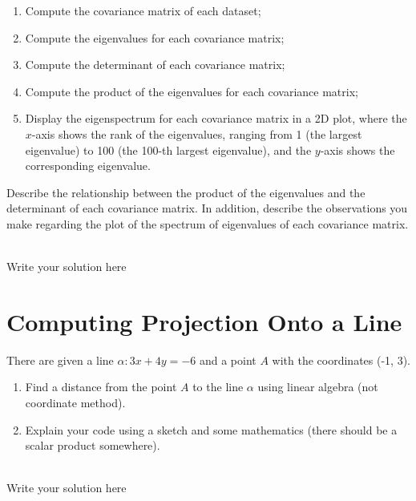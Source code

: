 \documentclass[a4paper]{article}
\begin{document}
\begin{enumerate}
    \begin{enumerate}[label=(\alph*)]
        \item Compute the covariance matrix of each dataset;
        
        \item Compute the eigenvalues for each covariance matrix;
        
        \item Compute the determinant of each covariance matrix;
        
        \item Compute the product of the eigenvalues for each covariance matrix;
        
        \item Display the eigenspectrum for each covariance matrix in a 2D plot, where the $x$-axis shows the rank of the eigenvalues, ranging from 1 (the largest eigenvalue) to 100 (the 100-th largest eigenvalue), and the $y$-axis shows the corresponding eigenvalue.
    \end{enumerate}
    Describe the relationship between the product of the eigenvalues and the determinant of each covariance matrix.
    In addition, describe the observations you make regarding the plot of the spectrum of eigenvalues of each covariance matrix.

    \hrulefill \\
    Write your solution here
\end{enumerate}

\clearpage
\section{Computing Projection Onto a Line}
There are given a line $\alpha : 3x + 4y = -6$ and a point $A$ with the coordinates (-1, 3).
\begin{enumerate}
    \item Find a distance from the point $A$ to the line $\alpha$ using linear algebra (not coordinate method).
    \item Explain your code using a sketch and some mathematics (there should be a scalar product somewhere).
\end{enumerate}

\hrulefill \\
Write your solution here
\end{document}
